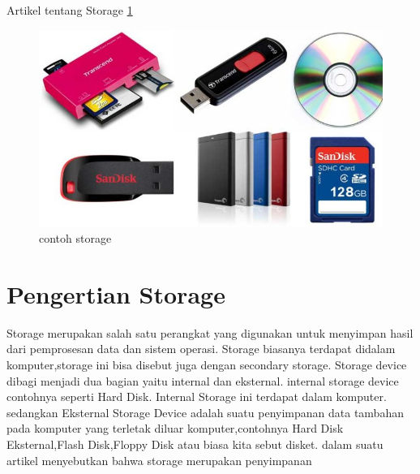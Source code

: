 






Artikel tentang Storage
\ref{storage}
\begin{figure}[ht]
\centerline{\includegraphics[width=1\texwidht]{figures/storage.jpg}}
\caption{contoh storage}
\label{storage}
\end{figure}





\section{Pengertian Storage}

Storage merupakan salah satu perangkat yang digunakan untuk menyimpan hasil dari pemprosesan data dan sistem operasi. Storage biasanya terdapat didalam komputer,storage ini bisa disebut juga dengan secondary storage.
Storage device dibagi menjadi dua bagian yaitu internal dan eksternal. internal storage device contohnya seperti Hard Disk. Internal Storage ini terdapat dalam komputer. sedangkan Eksternal Storage Device adalah suatu penyimpanan data tambahan pada komputer yang terletak diluar komputer,contohnya Hard Disk Eksternal,Flash Disk,Floppy Disk atau biasa kita sebut disket.
dalam suatu artikel menyebutkan bahwa storage merupakan penyimpanan \cite{weiser1999personal}

